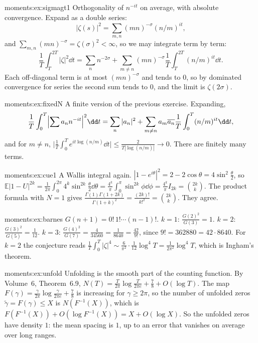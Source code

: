 \begin{solution}{moments:ex:sigmagt1}
\idea Orthogonality of $n^{-it}$ on average, with absolute convergence.
\writeup Expand as a double series:
\[
|\zeta(s)|^2=\sum_{m,n}(mn)^{-\sigma}(n/m)^{it},
\]
and $\sum_{m,n}(mn)^{-\sigma}=\zeta(\sigma)^2<\infty$, so we may integrate term by term:
\[
\frac1T\int_T^{2T}|\zeta|^2\dd t=\sum_n n^{-2\sigma}+\sum_{m\ne n}(mn)^{-\sigma}\frac1T\int_T^{2T}(n/m)^{it}\dd t.
\]
Each off-diagonal term is at most $(mn)^{-\sigma}$ and
tends to $0$, so by dominated convergence for series the second sum tends to $0$, and the limit is $\zeta(2\sigma)$.
\end{solution}

\begin{solution}{moments:ex:fixedN}
\idea A finite version of the previous exercise.
\writeup Expanding,
\[
\frac1T\int_0^T\Bigl|\sum a_nn^{-it}\Bigr|^2\dd t=\sum_n|a_n|^2+\sum_{m\ne n}a_m\overline{a_n}\frac1T\int_0^T(n/m)^{it}\dd t,
\]
and for $m\ne n$,
$\bigl|\frac1T\int_0^Te^{it\log(n/m)}\dd t\bigr|\le\frac2{T|\log(n/m)|}\to0$. There are finitely many terms.
\end{solution}

\begin{solution}{moments:ex:cue1}
\idea A Wallis integral again.
\writeup $|1-e^{i\theta}|^2=2-2\cos\theta=4\sin^2\frac\theta2$, so $\mathbb E|1-U|^{2k}=\frac1{2\pi}\int_0^{2\pi}4^k\sin^{2k}\frac\theta2\dd\theta=\frac{4^k}\pi\int_0^\pi\sin^{2k}\phi\dd\phi=\frac{4^k}\pi I_{2k}=\binom{2k}k$.
The product formula with $N=1$ gives $\frac{\Gamma(1)\Gamma(1+2k)}{\Gamma(1+k)^2}=\frac{(2k)!}{k!^2}=\binom{2k}k$. They agree.
\end{solution}

\begin{solution}{moments:ex:barnes}
\idea $G(n+1)=0!\,1!\cdots(n-1)!$.
\writeup $k=1$: $\frac{G(2)^2}{G(3)}=1$. $k=2$: $\frac{G(3)^2}{G(5)}=\frac1{12}$. $k=3$: $\frac{G(4)^2}{G(7)}=\frac4{34560}=\frac1{8640}=\frac{42}{9!}$, since $9!=362880=42\cdot8640$.
For $k=2$ the conjecture reads $\frac1T\int_0^T|\zeta|^4\sim\frac6{\pi^2}\cdot\frac1{12}\log^4T=\frac1{2\pi^2}\log^4T$, which is Ingham's theorem.
\end{solution}

\begin{solution}{moments:ex:unfold}
\idea Unfolding is the smooth part of the counting function.
\writeup By Volume~6, Theorem~6.9, $N(T)=\frac T{2\pi}\log\frac T{2\pi e}+\frac78+O(\log T)$. The map $F(\gamma)=\frac\gamma{2\pi}\log\frac\gamma{2\pi e}+\frac78$ is increasing for $\gamma\ge2\pi$,
so the number of unfolded zeros $\tilde\gamma=F(\gamma)\le X$ is $N(F^{-1}(X))$, which is $F(F^{-1}(X))+O(\log F^{-1}(X))=X+O(\log X)$. So the unfolded zeros
have density $1$: the mean spacing is $1$, up to an error that vanishes on average over long ranges.
\end{solution}

